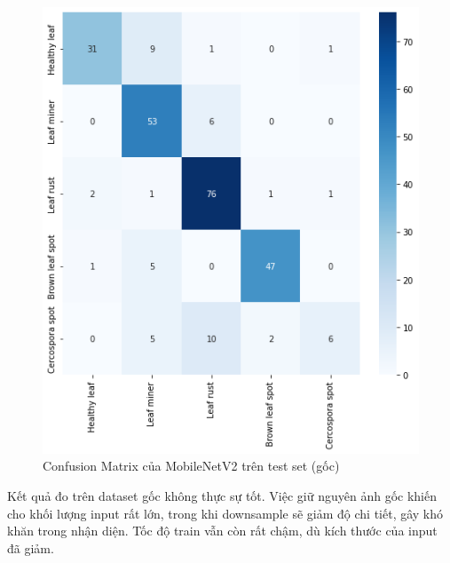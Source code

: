 \documentclass[a4paper,14pt]{extarticle}
\begin{document}
		\begin{figure}[H]
			\centering
			\includegraphics[scale=0.5]{images/mobilenetv2_matrix.png}
			\caption{Confusion Matrix của MobileNetV2 trên test set (gốc)}
		\end{figure}

		Kết quả đo trên dataset gốc không thực sự tốt. Việc giữ nguyên ảnh gốc khiến cho khối lượng input rất lớn, trong khi downsample sẽ giảm độ chi tiết, gây khó khăn trong nhận diện. Tốc độ train vẫn còn rất chậm, dù kích thước của input đã giảm.
\end{document}
